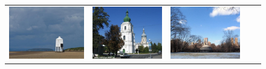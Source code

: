 \begin{figure}[!ht]
\begin{tabular}{c|cccc}
\includegraphics[height=\retrievalwidth\linewidth]{figures/applications/matching_horizon_group_2/00025416_jpg_original.jpg} &
\includegraphics[height=\retrievalwidth\linewidth]{figures/applications/matching_horizon_group_2/00014759_jpg_0_0016924598703210684.jpg} &
\includegraphics[height=\retrievalwidth\linewidth]{figures/applications/matching_horizon_group_2/00025187_jpg_0_002802485425429538.jpg} &

\end{tabular}
\end{figure}
